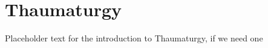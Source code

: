 \section{Thaumaturgy}
\label{sec:thaumaturgy}
Placeholder text for the introduction to Thaumaturgy, if we need one
